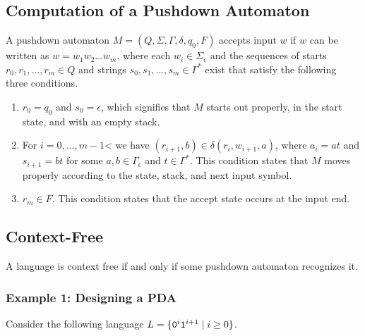 \documentclass[letterpaper]{article}
\begin{document}
\subsection{Computation of a Pushdown Automaton}
A pushdown automaton $M = (Q, \Sigma, \Gamma, \delta, q_0, F)$ accepts input $w$ if $w$ can be written as $w = w_1 w_2 \dots w_m$, where each $w_i \in \Sigma_{\epsilon}$ and the sequences of starts $r_0, r_1, \dots, r_m \in Q$ and strings $s_0, s_1, \dots, s_m \in \Gamma^*$ exist that satisfy the following three conditions.
\begin{enumerate}
    \item $r_0 = q_0$ and $s_0 = \epsilon$, which signifies that $M$ starts out properly, in the start state, and with an empty stack. 
    \item For $i = 0, \dots, m - 1$< we have $(r_{i + 1}, b) \in \delta(r_i, w_{i + 1}, a)$, where $a_i = at$ and $s_{i + 1} = bt$ for some $a, b \in \Gamma_{\epsilon}$ and $t \in \Gamma^*$. This condition states that $M$ moves properly according to the state, stack, and next input symbol. 
    \item $r_m \in F$. This condition states that the accept state occurs at the input end. 
\end{enumerate}

\subsection{Context-Free}
\begin{theorem}{}{}
    A language is context free if and only if some pushdown automaton recognizes it.
\end{theorem}

\subsubsection{Example 1: Designing a PDA}
Consider the following language $L = \{\texttt{0}^i \texttt{1}^{i + 1} \mid i \geq 0\}$. 
\end{document}
